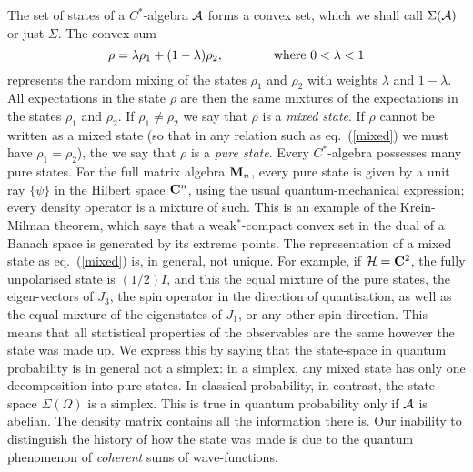 The set of states of a $C^*$-algebra ${\cal A}$ forms a convex set, which
we shall call $\Sigma({\cal A})$ or just $\Sigma$. The convex sum
\begin{equation}
\rho=\lambda\rho_1+(1-\lambda)\rho_2,\hspace{.5in}\mbox{ where }0
<\lambda<1
\label{mixed}
\end{equation}
represents the random mixing of the states $\rho_1$ and $\rho_2$ with
weights $\lambda$ and $1-\lambda$. All expectations in the state
$\rho$ are then the same mixtures of the expectations in the states
$\rho_1$ and $\rho_2$. If $\rho_1\neq\rho_2$ we say that $\rho$ is a
{\em mixed state}. If $\rho$ cannot be written as a mixed state (so that in
any relation such as eq.~(\ref{mixed}) we must have $\rho_1=\rho_2$), the
we say that $\rho$ is a {\em pure state}. Every $C^*$-algebra possesses
many pure states. For the full matrix algebra ${\bf M}_n$, every
pure state is given by a unit ray $\{\psi\}$ in the Hilbert space
${\bf C}^n$, using the usual quantum-mechanical expression;
every density operator is a mixture of such.
This is an example of the Krein-Milman theorem, which says that a
weak$^*$-compact convex set in the dual of a Banach space is generated
by its extreme points. The representation of a mixed state as 
eq.~(\ref{mixed}) is, in general, not unique. For example, if ${\cal
H}={\bf C}^2$, the fully unpolarised state is $(1/2)I$, and this the
equal mixture of the pure states, the eigen-vectors of $J_3$, the spin
operator in the direction of quantisation, as well as the equal mixture
of the eigenstates of $J_1$, or any other spin direction.
This means that all statistical properties of the observables are the
same however the state was made up. We express this by saying that the
state-space in quantum probability is in general not a simplex: in a
simplex, any mixed state has only one decomposition into pure states. In
classical probability, in contrast, the state space $\Sigma(\Omega)$ is a
simplex. This is true in quantum probability only if ${\cal A}$ is
abelian. The density matrix contains all the information there is. Our
inability to
distinguish the history of how the state was made is due to the quantum
phenomenon of {\em coherent} sums of wave-functions.

